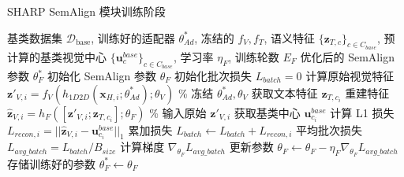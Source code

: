 \begin{algorithm}[htbp]
\caption{SHARP SemAlign 模块训练阶段}
\label{alg:semalign_training}
\begin{algorithmic}[1]
\REQUIRE 基类数据集 $\mathcal{D}_{\text{base}}$, 训练好的适配器 $\theta_{Ad}^*$, 冻结的 $f_V, f_T$, 语义特征 $\{\mathbf{z}_{T,c}\}_{c \in C_{base}}$, 预计算的基类视觉中心 $\{\mathbf{u}_c^{base}\}_{c \in C_{base}}$, 学习率 $\eta_F$, 训练轮数 $E_F$
\ENSURE 优化后的 SemAlign 参数 $\theta_F^*$
\STATE 初始化 SemAlign 参数 $\theta_F$
        \STATE 初始化批次损失 $L_{batch} = 0$
            \STATE 计算原始视觉特征 $\mathbf{z}'_{V,i} = f_V(h_{1D2D}(\mathbf{x}_{H,i}; \theta_{Ad}^*); \theta_V)$ \% 冻结 $\theta_{Ad}^*, \theta_V$
            \STATE 获取文本特征 $\mathbf{z}_{T,c_i}$
            \STATE 重建特征 $\hat{\mathbf{z}}_{V,i} = h_F([\mathbf{z}'_{V,i}; \mathbf{z}_{T,c_i}]; \theta_F)$ \% 输入原始 $\mathbf{z}'_{V,i}$
            \STATE 获取基类中心 $\mathbf{u}_{c_i}^{base}$
            \STATE 计算 L1 损失 $L_{recon, i} = || \hat{\mathbf{z}}_{V,i} - \mathbf{u}_{c_i}^{base} ||_1$
            \STATE 累加损失 $L_{batch} \leftarrow L_{batch} + L_{recon, i}$
        \ENDFOR %
        \STATE 平均批次损失 $L_{avg\_batch} = L_{batch} / B_{size}$
        \STATE 计算梯度 $\nabla_{\theta_F} L_{avg\_batch}$
        \STATE 更新参数 $\theta_F \leftarrow \theta_F - \eta_F \nabla_{\theta_F} L_{avg\_batch}$ %
    \ENDFOR %
\ENDFOR %
\STATE 存储训练好的参数 $\theta_F^* \leftarrow \theta_F$
\end{algorithmic}
\end{algorithm}

